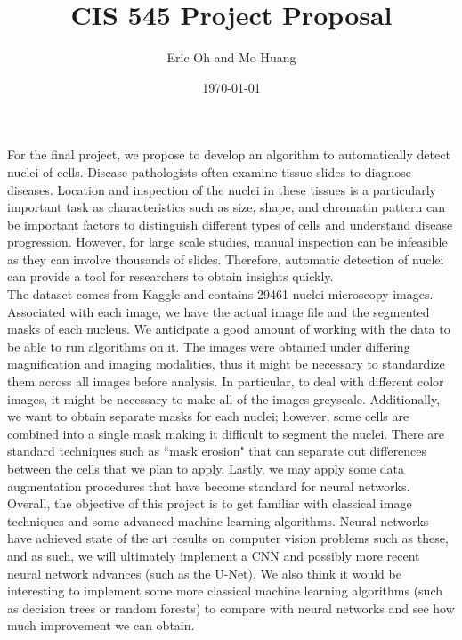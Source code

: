\documentclass{article}
\title{CIS 545 Project Proposal}
\author{Eric Oh and Mo Huang}
\date{\today}
\begin{document}
\maketitle

For the final project, we propose to develop an algorithm to automatically detect nuclei of cells. Disease pathologists often examine tissue slides to diagnose diseases. Location and inspection of the nuclei in these tissues is a particularly important task as characteristics such as size, shape, and chromatin pattern can be important factors to distinguish different types of cells and understand disease progression. However, for large scale studies, manual inspection can be infeasible as they can involve thousands of slides. Therefore, automatic detection of nuclei can provide a tool for researchers to obtain insights quickly. \\

The dataset comes from Kaggle and contains 29461 nuclei microscopy images. Associated with each image, we have the actual image file and the segmented masks of each nucleus. We anticipate a good amount of working with the data to be able to run algorithms on it. The images were obtained under differing magnification and imaging modalities, thus it might be necessary to standardize them across all images before analysis. In particular, to deal with different color images, it might be necessary to make all of the images greyscale. Additionally, we want to obtain separate masks for each nuclei; however, some cells are combined into a single mask making it difficult to segment the nuclei. There are standard techniques such as ``mask erosion" that can separate out differences between the cells that we plan to apply. Lastly, we may apply some data augmentation procedures that have become standard for neural networks. \\

Overall, the objective of this project is to get familiar with classical image techniques and some advanced machine learning algorithms. Neural networks have achieved state of the art results on computer vision problems such as these, and as such, we will ultimately implement a CNN and possibly more recent neural network advances (such as the U-Net). We also think it would be interesting to implement some more classical machine learning algorithms (such as decision trees or random forests) to compare with neural networks and see how much improvement we can obtain. 
\end{document}
